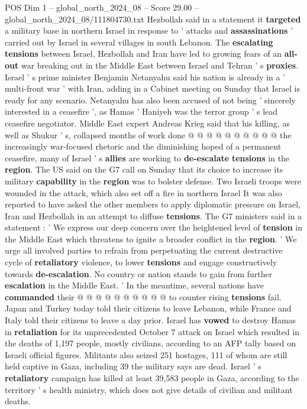 \begin{textsample}{POS Dim 1 – global\_north\_2024\_08 – Score 29.00 – global\_north\_2024\_08/111804730.txt}
Hezbollah said in a statement it \textbf{targeted} a military base in northern Israel in response to ' attacks and \textbf{assassinations} ' carried out by Israel in several villages in south Lebanon.
The \textbf{escalating} \textbf{tensions} between Israel, Hezbollah and Iran have led to growing fears of an \textbf{all-out} war breaking out in the Middle East between Israel and Tehran ' s \textbf{proxies}.
Israel ' s prime minister Benjamin Netanyahu said his nation is already in a ' multi-front war ' with Iran, adding in a Cabinet meeting on Sunday that Israel is ready for any scenario.
Netanyahu has also been accused of not being ' sincerely interested in a ceasefire ', as Hamas ' Haniyeh was the terror group ' s lead ceasefire negotiator.
Middle East expert Andreas Krieg said that his killing, as well as Shukur ' s, collapsed months of work done @ @ @ @ @ @ @ @ @ @ the increasingly war-focused rhetoric and the diminishing hoped of a permanent ceasefire, many of Israel ' s \textbf{allies} are working to \textbf{de-escalate} \textbf{tensions} in the \textbf{region}.
The US said on the G7 call on Sunday that its choice to increase its military \textbf{capability} in the \textbf{region} was to bolster defense.
Two Israeli troops were wounded in the attack, which also set off a fire in northern Israel It was also reported to have asked the other members to apply diplomatic pressure on Israel, Iran and Hezbollah in an attempt to diffuse \textbf{tensions}.
The G7 ministers said in a statement : ' We express our deep concern over the heightened level of \textbf{tension} in the Middle East which threatens to ignite a broader conflict in the \textbf{region}. ' We urge all involved parties to refrain from perpetuating the current destructive cycle of \textbf{retaliatory} violence, to lower \textbf{tensions} and engage constructively towards \textbf{de-escalation}.
No country or nation stands to gain from further \textbf{escalation} in the Middle East. ' In the meantime, several nations have \textbf{commanded} their @ @ @ @ @ @ @ @ @ @ to counter rising \textbf{tensions} fail.
Japan and Turkey today told their citizens to leave Lebanon, while France and Italy told their citizens to leave a day prior.
Israel has \textbf{vowed} to destroy Hamas in \textbf{retaliation} for its unprecedented October 7 attack on Israel which resulted in the deaths of 1,197 people, mostly civilians, according to an AFP tally based on Israeli official figures.
Militants also seized 251 hostages, 111 of whom are still held captive in Gaza, including 39 the military says are dead.
Israel ' s \textbf{retaliatory} campaign has killed at least 39,583 people in Gaza, according to the territory ' s health ministry, which does not give details of civilian and militant deaths.

\end{textsample}
